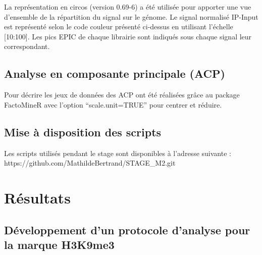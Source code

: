 \documentclass[a4paper,12pt,times]{report}
\begin{document}
\bigskip
      La représentation en circos \cite{circos} (version 0.69-6) a été utilisée pour apporter une vue d'ensemble de la répartition du signal sur le génome. Le signal normalisé IP-Input est représenté selon le code couleur présenté ci-dessus en utilisant l'échelle [10:100]. Les pics EPIC de chaque librairie sont indiqués sous chaque signal leur correspondant.
      
     

\section{Analyse en composante principale (ACP)}
     
     Pour décrire les jeux de données des ACP ont été réalisées grâce au package FactoMineR \cite{ACParticle} avec l'option ``scale.unit=TRUE'' pour centrer et réduire.
  

\section{Mise à disposition des scripts}
Les scripts utilisés pendant le stage sont disponibles à l'adresse suivante : https://github.com/MathildeBertrand/STAGE\_M2.git
\newpage
\chapter*{{
\vspace*{-2cm}}Résultats}
\setcounter{section}{0}
   

    \section{Développement d'un protocole d'analyse pour la marque H3K9me3}
        
\end{document}
